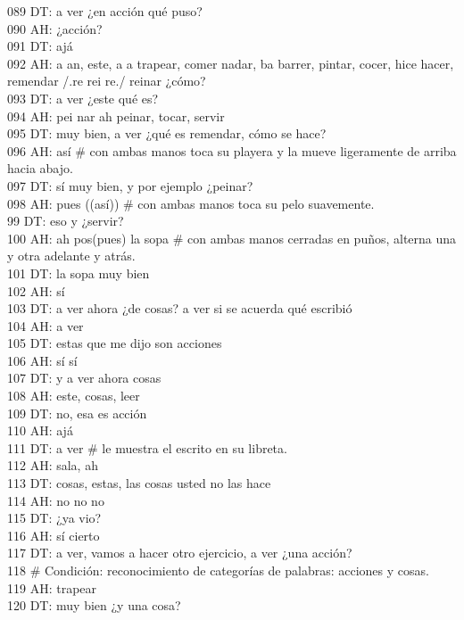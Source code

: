 089 DT: a ver ¿en acción qué puso?\\
090 AH: ¿acción?\\
091 DT: ajá\\
092 AH: a an, este, a a trapear, comer nadar, ba barrer, pintar, cocer, hice hacer, remendar /.re rei re./ reinar ¿cómo?\\
093 DT: a ver ¿este qué es?\\
094 AH: pei nar ah peinar, tocar, servir\\
095 DT: muy bien, a ver ¿qué es remendar, cómo se hace?\\
096 AH: así \# con ambas manos toca su playera y la mueve ligeramente de arriba hacia abajo.\\
097 DT: sí muy bien, y por ejemplo ¿peinar?\\
098 AH: pues ((así)) \# con ambas manos toca su pelo suavemente.\\
99 DT: eso y ¿servir?\\
100 AH: ah pos(pues) la sopa \# con ambas manos cerradas en puños, alterna una y otra adelante y atrás.\\
101 DT: la sopa muy bien\\
102 AH: sí\\
103 DT: a ver ahora ¿de cosas? a ver si se acuerda qué escribió\\
104 AH: a ver\\
105 DT: estas que me dijo son acciones\\
106 AH: sí sí\\
107 DT: y a ver ahora cosas\\
108 AH: este, cosas, leer\\
109 DT: no, esa es acción\\
110 AH: ajá\\
111 DT: a ver \# le muestra el escrito en su libreta.\\
112 AH: sala, ah\\
113 DT: cosas, estas, las cosas usted no las hace\\
114 AH: no no no\\
115 DT: ¿ya vio?\\
116 AH: sí cierto\\
117 DT: a ver, vamos a hacer otro ejercicio, a ver ¿una acción?\\
118 \# Condición: reconocimiento de categorías de palabras: acciones y cosas.\\
119 AH: trapear\\
120 DT: muy bien ¿y una cosa?\\
